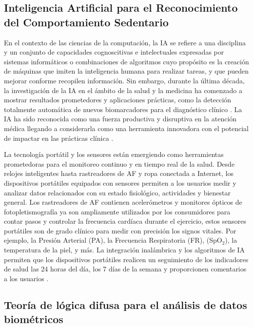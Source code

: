 \subsection{Inteligencia Artificial para el Reconocimiento del Comportamiento Sedentario}
\label{subsec:ia_reconocimiento_cs}

En el contexto de las ciencias de la computación, la IA se refiere a una disciplina y un conjunto de capacidades cognoscitivas e intelectuales expresadas por sistemas informáticos o combinaciones de algoritmos cuyo propósito es la creación de máquinas que imiten la inteligencia humana para realizar tareas, y que pueden mejorar conforme recopilen información. Sin embargo, durante la última década, la investigación de la IA en el ámbito de la salud y la medicina ha comenzado a mostrar resultados prometedores y aplicaciones prácticas, como la detección totalmente automática de nuevos biomarcadores para el diagnóstico clínico \citep{Farrahi2024MachineLearning}. La IA ha sido reconocida como una fuerza productiva y disruptiva en la atención médica llegando a considerarla como una herramienta innovadora con el potencial de impactar en las prácticas clínica \citep{Santos2021Perceptions,SyedAbdul2020DataAnalytics}.

La tecnología portátil y los sensores están emergiendo como herramientas prometedoras para el monitoreo continuo y en tiempo real de la salud. Desde relojes inteligentes hasta rastreadores de AF y ropa conectada a Internet, los dispositivos portátiles equipados con sensores permiten a los usuarios medir y analizar datos relacionados con su estado fisiológico, actividades y bienestar general. Los rastreadores de AF contienen acelerómetros y monitores ópticos de fotopletismografía ya son ampliamente utilizados por los consumidores para contar pasos y controlar la frecuencia cardíaca durante el ejercicio, estos sensores portátiles son de grado clínico para medir con precisión los signos vitales. Por ejemplo, la Presión Arterial (PA), la Frecuencia Respiratoria (FR), (SpO$_2$), la temperatura de la piel, y más. La integración inalámbrica y los algoritmos de IA permiten que los dispositivos portátiles realicen un seguimiento de los indicadores de salud las 24 horas del día, los 7 días de la semana y proporcionen comentarios a los usuarios \citep{Khan2024Wearable}.

\subsection{Teoría de lógica difusa para el análisis de datos biométricos}
\label{subsec:teoria_logica_difusa}

